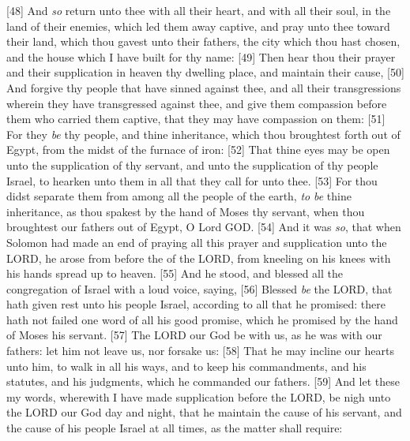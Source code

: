 [48] \textcolor[cmyk]{0.99998,1,0,0}{And \emph{so} return unto thee with all their heart, and with all their soul, in the land of their enemies, which led them away captive, and pray unto thee toward their land, which thou gavest unto their fathers, the city which thou hast chosen, and the house which I have built for thy name:}
[49] \textcolor[cmyk]{0.99998,1,0,0}{Then hear thou their prayer and their supplication in heaven thy dwelling place, and maintain their cause,}
[50] \textcolor[cmyk]{0.99998,1,0,0}{And forgive thy people that have sinned against thee, and all their transgressions wherein they have transgressed against thee, and give them compassion before them who carried them captive, that they may have compassion on them:}
[51] \textcolor[cmyk]{0.99998,1,0,0}{For they \emph{be} thy people, and thine inheritance, which thou broughtest forth out of Egypt, from the midst of the furnace of iron:}
[52] \textcolor[cmyk]{0.99998,1,0,0}{That thine eyes may be open unto the supplication of thy servant, and unto the supplication of thy people Israel, to hearken unto them in all that they call for unto thee.}
[53] \textcolor[cmyk]{0.99998,1,0,0}{For thou didst separate them from among all the people of the earth, \emph{to} \emph{be} thine inheritance, as thou spakest by the hand of Moses thy servant, when thou broughtest our fathers out of Egypt, O Lord GOD.}
[54] \textcolor[cmyk]{0.99998,1,0,0}{And it was \emph{so}, that when Solomon had made an end of praying all this prayer and supplication unto the LORD, he arose from before the  of the LORD, from kneeling on his knees with his hands spread up to heaven.}
[55] \textcolor[cmyk]{0.99998,1,0,0}{And he stood, and blessed all the congregation of Israel with a loud voice, saying,}
[56] \textcolor[cmyk]{0.99998,1,0,0}{Blessed \emph{be} the LORD, that hath given rest unto his people Israel, according to all that he promised: there hath not failed one word of all his good promise, which he promised by the hand of Moses his servant.}
[57] \textcolor[cmyk]{0.99998,1,0,0}{The LORD our God be with us, as he was with our fathers: let him not leave us, nor forsake us:}
[58] \textcolor[cmyk]{0.99998,1,0,0}{That he may incline our hearts unto him, to walk in all his ways, and to keep his commandments, and his statutes, and his judgments, which he commanded our fathers.}
[59] \textcolor[cmyk]{0.99998,1,0,0}{And let these my words, wherewith I have made supplication before the LORD, be nigh unto the LORD our God day and night, that he maintain the cause of his servant, and the cause of his people Israel at all times, as the matter shall require:}
